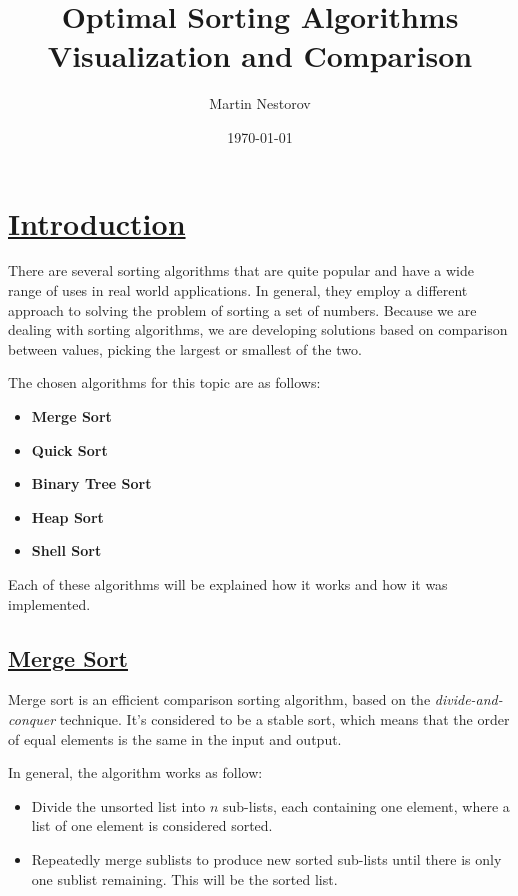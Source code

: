 \documentclass{article}
\title{Optimal Sorting Algorithms\\Visualization and Comparison}
\date{\today}
\author{Martin Nestorov}
\begin{document}
\maketitle
{}

\newpage

\section{\underline{Introduction}}

There are several sorting algorithms that are quite popular and have a wide range of uses in real world applications. In general, they employ a different approach to solving the problem of sorting a set of numbers. Because we are dealing with sorting algorithms, we are developing solutions based on comparison between values, picking the largest or smallest of the two.

The chosen algorithms for this topic are as follows:

\begin{itemize}
\item \textbf{Merge Sort}
\item \textbf{Quick Sort}
\item \textbf{Binary Tree Sort}
\item \textbf{Heap Sort}
\item \textbf{Shell Sort}
\end{itemize}

Each of these algorithms will be explained how it works and how it was implemented.

\subsection{\underline{Merge Sort}}

Merge sort is an efficient comparison sorting algorithm, based on the \textit{divide-and-conquer} technique. It's considered to be a stable sort, which means that the order of equal elements is the same in the input and output.

In general, the algorithm works as follow:
\begin{itemize}
\item Divide the unsorted list into $n$ sub-lists, each containing one element, where a list of one element is considered sorted.
\item Repeatedly merge sublists to produce new sorted sub-lists until there is only one sublist remaining. This will be the sorted list.
\end{itemize}
\end{document}
